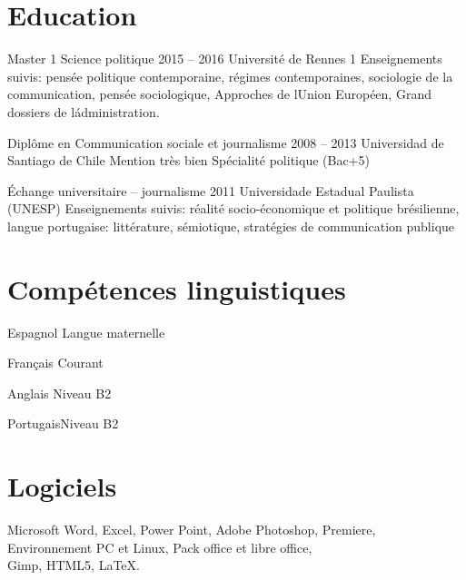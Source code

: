 \documentclass{tccv}
\begin{document}
\begin{minipage}{0.29\textwidth} 

\section{Education}
\begin{yearlist}

\item[Master 1 Science politique]{2015 -- 2016}
     {Université de Rennes 1}
     {Enseignements suivis: pensée politique contemporaine, régimes contemporaines, sociologie de la communication, pensée sociologique, Approches de lUnion Européen, Grand dossiers de l\' administration.}


  

\item[Diplôme en Communication sociale et journalisme]{2008 -- 2013}
     {Universidad de Santiago de Chile}
     {Mention très bien
      Spécialité politique
      (Bac+5)}

     
\item[Échange universitaire -- journalisme]{2011}
     {Universidade Estadual Paulista (UNESP)}
     {Enseignements suivis: réalité socio-économique et politique brésilienne, langue portugaise: littérature, sémiotique, stratégies de communication publique}


\end{yearlist}



\section{Compétences linguistiques}

\begin{factlist}
\item{Espagnol} {Langue maternelle}	
\item{Français} {Courant}	
\item{Anglais}  {Niveau B2}	
\item{Portugais}{Niveau B2}
\end{factlist}

\section{Logiciels}

Microsoft Word, Excel, Power Point, Adobe Photoshop, Premiere, \\
Environnement PC et Linux,
Pack office et libre office, \\
Gimp,
HTML5,
\LaTeX.

\end{minipage}
\end{document}
